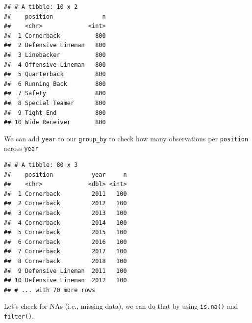 \documentclass[
]{book}
\newenvironment{Shaded}{\begin{snugshade}}{\end{snugshade}}
\newcommand{\KeywordTok}[1]{\textcolor[rgb]{0.13,0.29,0.53}{\textbf{#1}}}
\newcommand{\NormalTok}[1]{#1}
\newcommand{\OperatorTok}[1]{\textcolor[rgb]{0.81,0.36,0.00}{\textbf{#1}}}
\newcommand{\StringTok}[1]{\textcolor[rgb]{0.31,0.60,0.02}{#1}}
\begin{document}
\begin{Shaded}
\end{Shaded}

\begin{verbatim}
## # A tibble: 10 x 2
##    position              n
##    <chr>             <int>
##  1 Cornerback          800
##  2 Defensive Lineman   800
##  3 Linebacker          800
##  4 Offensive Lineman   800
##  5 Quarterback         800
##  6 Running Back        800
##  7 Safety              800
##  8 Special Teamer      800
##  9 Tight End           800
## 10 Wide Receiver       800
\end{verbatim}

We can add \texttt{year} to our \texttt{group\_by} to check how many observations per \texttt{position} across \texttt{year}

\begin{Shaded}
\end{Shaded}

\begin{verbatim}
## # A tibble: 80 x 3
##    position           year     n
##    <chr>             <dbl> <int>
##  1 Cornerback         2011   100
##  2 Cornerback         2012   100
##  3 Cornerback         2013   100
##  4 Cornerback         2014   100
##  5 Cornerback         2015   100
##  6 Cornerback         2016   100
##  7 Cornerback         2017   100
##  8 Cornerback         2018   100
##  9 Defensive Lineman  2011   100
## 10 Defensive Lineman  2012   100
## # ... with 70 more rows
\end{verbatim}

Let's check for NAs (i.e., missing data), we can do that by using \texttt{is.na()} and \texttt{filter()}.

\begin{Shaded}
\end{Shaded}
\end{document}
